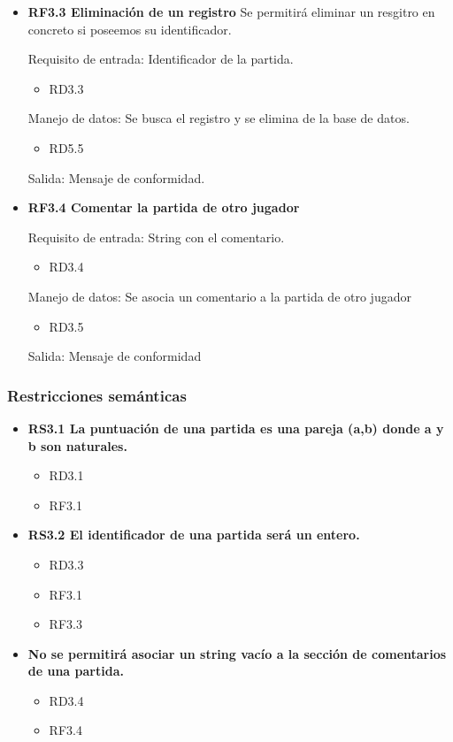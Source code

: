 \begin{itemize}
	\item \textbf{RF3.3 Eliminación de un registro} Se permitirá eliminar un resgitro en concreto si poseemos su identificador.

	Requisito de entrada: Identificador de la partida.
	\begin{itemize}
		\item RD3.3
	\end{itemize}

	Manejo de datos: Se busca el registro y se elimina de la base de datos. \\
	\begin{itemize}
		\item RD5.5
	\end{itemize}

	Salida: Mensaje de conformidad. \\

	\item \textbf{RF3.4 Comentar la partida de otro jugador}

	Requisito de entrada: String con el comentario.
	\begin{itemize}
		\item RD3.4
	\end{itemize}

	Manejo de datos: Se asocia un comentario a la partida de otro jugador
	\begin{itemize}
		\item RD3.5
	\end{itemize}

	Salida: Mensaje de conformidad \\

\end{itemize}

	\subsubsection{Restricciones semánticas}

	\begin{itemize}
		\item \textbf{RS3.1 La puntuación de una partida es una pareja (a,b) donde a y b son naturales.}
			\begin{itemize}
				\item RD3.1
				\item RF3.1
			\end{itemize}
		\item \textbf{RS3.2 El identificador de una partida será un entero.}
			\begin{itemize}
				\item RD3.3
				\item RF3.1
				\item RF3.3
			\end{itemize}

		\item \textbf{No se permitirá asociar un string vacío a la sección de comentarios de una partida.}
		\begin{itemize}
			\item RD3.4
			\item RF3.4
		\end{itemize}
	\end{itemize}
